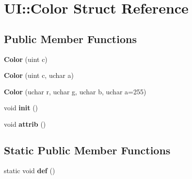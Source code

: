 \hypertarget{struct_u_i_1_1_color}{}\section{UI\+:\+:Color Struct Reference}
\label{struct_u_i_1_1_color}
\subsection*{Public Member Functions}
\begin{DoxyCompactItemize}
\item 
\mbox{\label{struct_u_i_1_1_color_ab39cad2acfedd778dcbb6a05440c6216}} 
{\bfseries Color} (uint c)
\item 
\mbox{\label{struct_u_i_1_1_color_a105f73289a5aa69aa921d31551ed3d2e}} 
{\bfseries Color} (uint c, uchar a)
\item 
\mbox{\label{struct_u_i_1_1_color_a3ddf38ab18328bdc11a018b1f4b9fbd2}} 
{\bfseries Color} (uchar r, uchar g, uchar b, uchar a=255)
\item 
\mbox{\label{struct_u_i_1_1_color_aacfcfb9d557646c4a0d0214df3857e0c}} 
void {\bfseries init} ()
\item 
\mbox{\label{struct_u_i_1_1_color_a69fa265829fe080c159d72da2829c7c3}} 
void {\bfseries attrib} ()
\end{DoxyCompactItemize}
\subsection*{Static Public Member Functions}
\begin{DoxyCompactItemize}
\item 
\mbox{\label{struct_u_i_1_1_color_af2108f6ccfb6a4e264bab2930f300963}} 
static void {\bfseries def} ()
\end{DoxyCompactItemize}
